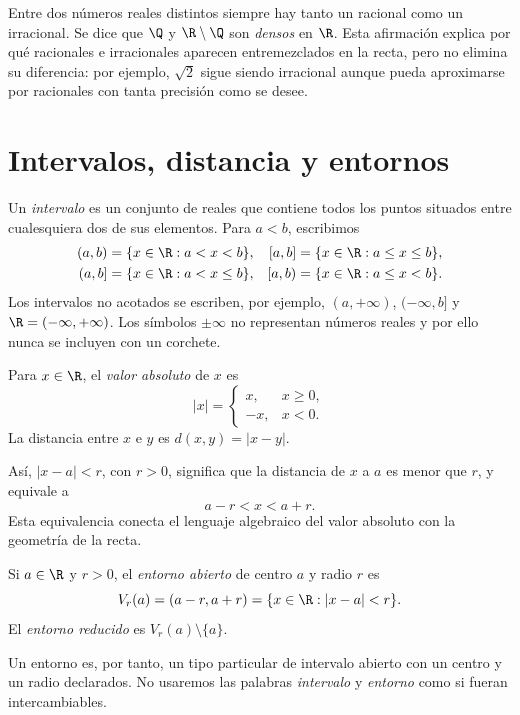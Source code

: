 Entre dos números reales distintos siempre hay tanto un racional como un
irracional. Se dice que \(\Q\) y \(\R\setminus\Q\) son \emph{densos} en
\(\R\). Esta afirmación explica por qué racionales e irracionales aparecen
entremezclados en la recta, pero no elimina su diferencia: por ejemplo,
\(\sqrt2\) sigue siendo irracional aunque pueda aproximarse por racionales con
tanta precisión como se desee.

\section{Intervalos, distancia y entornos}
\label{sec:intervalos-distancia-entornos}

Un \emph{intervalo} es un conjunto de reales que contiene todos los puntos
situados entre cualesquiera dos de sus elementos. Para \(a<b\), escribimos
\[
\begin{aligned}
 (a,b)&=\{x\in\R:a<x<b\},
& [a,b]&=\{x\in\R:a\le x\le b\},\\
 (a,b]&=\{x\in\R:a<x\le b\},
& [a,b)&=\{x\in\R:a\le x<b\}.
\end{aligned}
\]
Los intervalos no acotados se escriben, por ejemplo,
\((a,+\infty)\), \(( -\infty,b]\) y \(\R=(-\infty,+\infty)\). Los símbolos
\(\pm\infty\) no representan números reales y por ello nunca se incluyen con
un corchete.

\begin{definicion}
Para \(x\in\R\), el \emph{valor absoluto} de \(x\) es
\[
 |x|=\begin{cases}x,&x\ge0,\\-x,&x<0.\end{cases}
\]
La distancia entre \(x\) e \(y\) es \(d(x,y)=|x-y|\).
\end{definicion}

Así, \(|x-a|<r\), con \(r>0\), significa que la distancia de \(x\) a \(a\)
es menor que \(r\), y equivale a
\[
  a-r<x<a+r.
\]
Esta equivalencia conecta el lenguaje algebraico del valor absoluto con la
geometría de la recta.

\begin{definicion}[Entorno]
Si \(a\in\R\) y \(r>0\), el \emph{entorno abierto} de centro \(a\) y radio
\(r\) es
\[
  V_r(a)=(a-r,a+r)=\{x\in\R:|x-a|<r\}.
\]
El \emph{entorno reducido} es
\(V_r(a)\setminus\{a\}\).
\end{definicion}

Un entorno es, por tanto, un tipo particular de intervalo abierto con un centro
y un radio declarados. No usaremos las palabras \emph{intervalo} y
\emph{entorno} como si fueran intercambiables.

